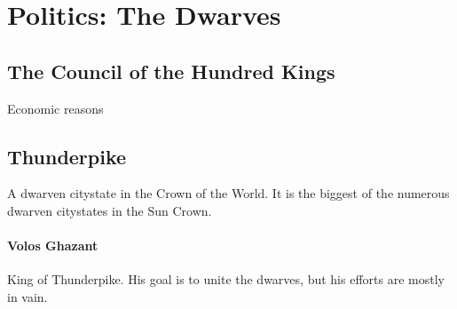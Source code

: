 \documentclass[../main.tex]{subfiles}
\begin{document}
\section{Politics: The Dwarves}

\subsection{The Council of the Hundred Kings}
Economic reasons

\subsection{Thunderpike}
A dwarven citystate in the Crown of the World. It is the
biggest of the numerous dwarven citystates in the
Sun Crown.

\paragraph{Volos Ghazant}
King of Thunderpike. His goal is to unite the dwarves, but
his efforts are mostly in vain.
\end{document}
